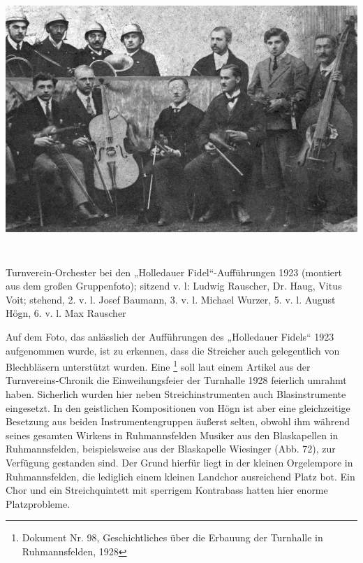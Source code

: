 \includegraphics[width=15.822cm,height=10.109cm]{pictures/zulassungsarbeit-img072.jpg}

\begin{figure}
\img{}
\caption{}
\end{figure}

Turnverein-Orchester bei den
„Holledauer Fidel“-Aufführungen 1923 (montiert aus dem großen
Gruppenfoto); sitzend v. l: Ludwig Rauscher, Dr. Haug, Vitus Voit;
stehend, 2. v. l. Josef Baumann, 3. v. l. Michael Wurzer, 5. v. l.
August Högn, 6. v. l. Max Rauscher

Auf dem Foto, das anlässlich der Aufführungen des „Holledauer Fidels“
1923 aufgenommen wurde, ist zu erkennen, dass die Streicher auch
gelegentlich von Blechbläsern unterstützt wurden. Eine
  \footnote{Dokument Nr. 98, Geschichtliches über die Erbauung
der Turnhalle in Ruhmannsfelden, 1928} soll laut einem Artikel aus der
Turnvereins-Chronik die Einweihungsfeier der Turnhalle 1928 feierlich
umrahmt haben. Sicherlich wurden hier neben Streichinstrumenten auch
Blasinstrumente eingesetzt. In den geistlichen Kompositionen von Högn
ist aber eine gleichzeitige Besetzung aus beiden Instrumentengruppen
äußerst selten, obwohl ihm während seines gesamten Wirkens in
Ruhmannsfelden Musiker aus den Blaskapellen in Ruhmannsfelden,
beispielsweise aus der Blaskapelle Wiesinger (Abb. 72), zur Verfügung
gestanden sind. Der Grund hierfür liegt in der kleinen Orgelempore in
Ruhmannsfelden, die lediglich einem kleinen Landchor ausreichend Platz
bot. Ein Chor und ein Streichquintett mit sperrigem Kontrabass hatten
hier enorme Platzprobleme.

